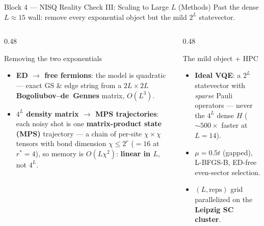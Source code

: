 \documentclass[aspectratio=169,12pt]{beamer}
\begin{document}
\begin{frame}{Block 4 --- NISQ Reality Check III: Scaling to Large $L$ (Methods)}
  \footnotesize
  Past the dense $L\!\approx\!15$ wall: remove every exponential object but the mild $2^L$ statevector.
  \begin{columns}[T,onlytextwidth]
    \begin{column}{0.48\textwidth}
      \begin{block}{Removing the two exponentials}
        \begin{itemize}\itemsep2pt
          \item \textbf{ED $\to$ free fermions}: the model is quadratic --- exact GS \& edge string from a $2L\times2L$ \textbf{Bogoliubov--de~Gennes} matrix, $O(L^3)$.
          \item \textbf{$4^L$ density matrix $\to$ MPS trajectories}: each noisy shot is one \textbf{matrix-product state (MPS)} trajectory --- a chain of per-site $\chi\!\times\!\chi$ tensors with bond dimension $\chi\le2^{r}$ ($=16$ at $r^\ast{=}4$), so memory is $O(L\chi^2)$: \textbf{linear in $L$}, not $4^L$.
        \end{itemize}
      \end{block}
    \end{column}
    \hfill
    \begin{column}{0.48\textwidth}
      \begin{block}{The mild object + HPC}
        \begin{itemize}\itemsep2pt
          \item \textbf{Ideal VQE}: a $2^L$ statevector with \emph{sparse} Pauli operators --- never the $4^L$ dense $H$ ($\sim\!500\times$ faster at $L=14$).
          \item $\mu=0.5t$ (gapped), L-BFGS-B, ED-free even-sector selection.
          \item $(L,\text{reps})$ grid parallelized on the \textbf{Leipzig SC cluster}.
        \end{itemize}
      \end{block}
    \end{column}
  \end{columns}
\end{frame}
\end{document}
